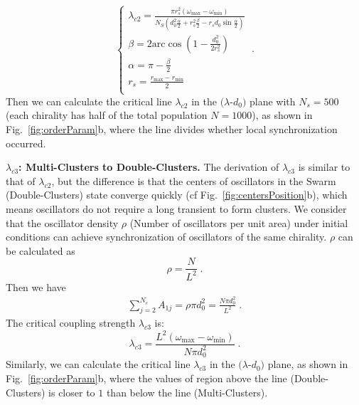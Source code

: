 \documentclass[%
 aip,
 amsmath,amssymb,
 reprint,%
]{revtex4-1}
\begin{document}
\begin{equation}
    \begin{cases}
        \lambda _{c2}=\frac{\pi r_{s}^{2}\left( \omega _{\max}-\omega _{\min} \right)}{N_S\left( d_{0}^{2}\frac{\alpha}{2}+r_{s}^{2}\frac{\beta}{2}-r_sd_0\sin \frac{\alpha}{2} \right)}\\
        \beta =2\mathrm{arc}\cos \left( 1-\frac{d_{0}^{2}}{2r_{s}^{2}} \right)\\
        \alpha =\pi -\frac{\beta}{2}\\
        r_s=\frac{r_{\max}-r_{\min}}{2}\\
    \end{cases}\;.
\end{equation}
Then we can calculate the critical line $\lambda_{c2}$ in the $(\lambda$-$d_0)$ plane with $N_s=500$ (each chirality has half of the total population $N=1000$), as shown in Fig.~\ref{fig:orderParam}b, where the line divides whether local synchronization occurred.

\vspace{0.25cm}
\noindent\textbf{$\lambda_{c3}$: Multi-Clusters to Double-Clusters.} 
The derivation of $\lambda_{c3}$ is similar to that of $\lambda_{c2}$, but the difference is that the centers of oscillators in the Swarm (Double-Clusters) state converge quickly (cf Fig.~\ref{fig:centersPosition}b), which means oscillators do not require a long transient to form clusters. We consider that the oscillator density $\rho$ (Number of oscillators per unit area) under initial conditions can achieve synchronization of oscillators of the same chirality. $\rho$ can be calculated as 
\begin{equation}
    \rho =\frac{N}{L^2}\;.
\end{equation}
Then we have 
\begin{eqnarray}
    \sum_{j=2}^{N_c}{A_{1j}}=\rho \pi d_{0}^{2}=\frac{N\pi d_{0}^{2}}{L^2}\;.
\end{eqnarray}
The critical coupling strength $\lambda_{c3}$ is:
\begin{equation}
    \lambda _{c3}=\frac{L^2\left( \omega _{\max}-\omega _{\min} \right)}{N\pi d_{0}^{2}}\;.
\end{equation}
Similarly, we can calculate the critical line $\lambda_{c3}$ in the $(\lambda$-$d_0)$ plane, as shown in Fig.~\ref{fig:orderParam}b, where the values of region above the line (Double-Clusters) is closer to $1$ than below the line (Multi-Clusters).
\end{document}
